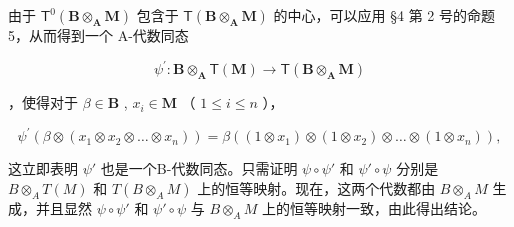 由于 \(\mathsf{T}^0 (\mathbf{B}\otimes_{\mathbf{A}}\mathbf{M})\) 包含于 \(\mathsf{T}(\mathbf{B}\otimes_{\mathbf{A}}\mathbf{M})\) 的中心，可以应用 §4 第 2 号的命题 5，从而得到一个 A-代数同态

\[
\psi^ {\prime}: \mathbf {B} \otimes_ {\mathbf {A}} \mathsf {T} (\mathbf {M}) \rightarrow \mathsf {T} (\mathbf {B} \otimes_ {\mathbf {A}} \mathbf {M})
\]

，使得对于 \(\beta \in \mathbf{B}\) , \(x_{i} \in \mathbf{M}\) （ \(1 \leqslant i \leqslant n\) ），

\[
\psi^ {\prime} (\beta \otimes (x _ {1} \otimes x _ {2} \otimes \dots \otimes x _ {n})) = \beta ((1 \otimes x _ {1}) \otimes (1 \otimes x _ {2}) \otimes \dots \otimes (1 \otimes x _ {n})),
\]

这立即表明 \(\psi'\) 也是一个B-代数同态。只需证明 \(\psi \circ \psi'\) 和 \(\psi' \circ \psi\) 分别是 \(B \otimes_{A} T(M)\) 和 \(T(B \otimes_{A} M)\) 上的恒等映射。现在，这两个代数都由 \(B \otimes_{A} M\) 生成，并且显然 \(\psi \circ \psi'\) 和 \(\psi' \circ \psi\) 与 \(B \otimes_{A} M\) 上的恒等映射一致，由此得出结论。

